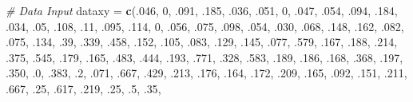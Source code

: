 \documentclass[]{article}
\newenvironment{Shaded}{\begin{snugshade}}{\end{snugshade}}
\newcommand{\KeywordTok}[1]{\textcolor[rgb]{0.13,0.29,0.53}{\textbf{#1}}}
\newcommand{\DecValTok}[1]{\textcolor[rgb]{0.00,0.00,0.81}{#1}}
\newcommand{\StringTok}[1]{\textcolor[rgb]{0.31,0.60,0.02}{#1}}
\newcommand{\CommentTok}[1]{\textcolor[rgb]{0.56,0.35,0.01}{\textit{#1}}}
\newcommand{\NormalTok}[1]{#1}
\begin{document}
\begin{Shaded}
\begin{Highlighting}[]
\CommentTok{# Data Input}
\NormalTok{dataxy =}\StringTok{ }\KeywordTok{c}\NormalTok{(.}\DecValTok{046}\NormalTok{, }\DecValTok{0}\NormalTok{, .}\DecValTok{091}\NormalTok{, .}\DecValTok{185}\NormalTok{, .}\DecValTok{036}\NormalTok{, .}\DecValTok{051}\NormalTok{, }\DecValTok{0}\NormalTok{, .}\DecValTok{047}\NormalTok{,}
\NormalTok{           .}\DecValTok{054}\NormalTok{, .}\DecValTok{094}\NormalTok{, .}\DecValTok{184}\NormalTok{, .}\DecValTok{034}\NormalTok{, .}\DecValTok{05}\NormalTok{, .}\DecValTok{108}\NormalTok{, .}\DecValTok{11}\NormalTok{, .}\DecValTok{095}\NormalTok{,}
\NormalTok{           .}\DecValTok{114}\NormalTok{, }\DecValTok{0}\NormalTok{, .}\DecValTok{056}\NormalTok{, .}\DecValTok{075}\NormalTok{, .}\DecValTok{098}\NormalTok{, .}\DecValTok{054}\NormalTok{, .}\DecValTok{030}\NormalTok{, .}\DecValTok{068}\NormalTok{,}
\NormalTok{           .}\DecValTok{148}\NormalTok{, .}\DecValTok{162}\NormalTok{, .}\DecValTok{082}\NormalTok{, .}\DecValTok{075}\NormalTok{, .}\DecValTok{134}\NormalTok{, .}\DecValTok{39}\NormalTok{, .}\DecValTok{339}\NormalTok{, .}\DecValTok{458}\NormalTok{,}
\NormalTok{           .}\DecValTok{152}\NormalTok{, .}\DecValTok{105}\NormalTok{, .}\DecValTok{083}\NormalTok{, .}\DecValTok{129}\NormalTok{, .}\DecValTok{145}\NormalTok{, .}\DecValTok{077}\NormalTok{, .}\DecValTok{579}\NormalTok{, .}\DecValTok{167}\NormalTok{, }
\NormalTok{           .}\DecValTok{188}\NormalTok{, .}\DecValTok{214}\NormalTok{, .}\DecValTok{375}\NormalTok{, .}\DecValTok{545}\NormalTok{, .}\DecValTok{179}\NormalTok{, .}\DecValTok{165}\NormalTok{, .}\DecValTok{483}\NormalTok{, .}\DecValTok{444}\NormalTok{,}
\NormalTok{           .}\DecValTok{193}\NormalTok{, .}\DecValTok{771}\NormalTok{, .}\DecValTok{328}\NormalTok{, .}\DecValTok{583}\NormalTok{, .}\DecValTok{189}\NormalTok{, .}\DecValTok{186}\NormalTok{, .}\DecValTok{168}\NormalTok{, .}\DecValTok{368}\NormalTok{,}
\NormalTok{           .}\DecValTok{197}\NormalTok{, .}\DecValTok{350}\NormalTok{, .}\DecValTok{0}\NormalTok{, .}\DecValTok{383}\NormalTok{, .}\DecValTok{2}\NormalTok{, .}\DecValTok{071}\NormalTok{, .}\DecValTok{667}\NormalTok{, .}\DecValTok{429}\NormalTok{,}
\NormalTok{           .}\DecValTok{213}\NormalTok{, .}\DecValTok{176}\NormalTok{, .}\DecValTok{164}\NormalTok{, .}\DecValTok{172}\NormalTok{, .}\DecValTok{209}\NormalTok{, .}\DecValTok{165}\NormalTok{, .}\DecValTok{092}\NormalTok{, .}\DecValTok{151}\NormalTok{,}
\NormalTok{           .}\DecValTok{211}\NormalTok{, .}\DecValTok{667}\NormalTok{, .}\DecValTok{25}\NormalTok{, .}\DecValTok{617}\NormalTok{, .}\DecValTok{219}\NormalTok{, .}\DecValTok{25}\NormalTok{, .}\DecValTok{5}\NormalTok{, .}\DecValTok{35}\NormalTok{,}

\end{Highlighting}
\end{Shaded}
\end{document}
